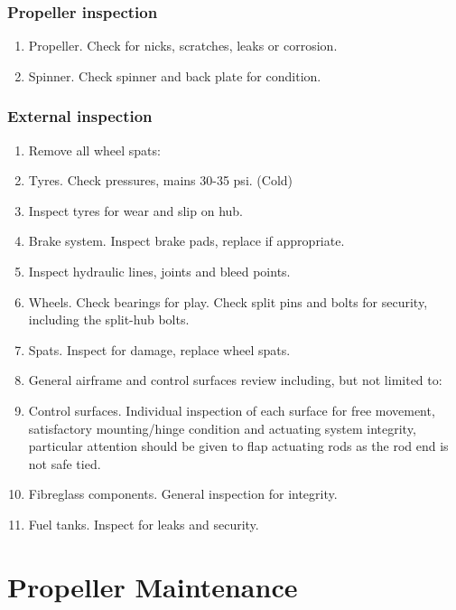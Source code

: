 \subsubsection{Propeller inspection}
\begin{enumerate}
\item Propeller. Check for nicks, scratches, leaks or corrosion.
\item Spinner. Check spinner and back plate for condition.
\end{enumerate}
\subsubsection{External inspection}
\begin{enumerate}
\item Remove all wheel spats:
\item Tyres. Check pressures, mains  30-35 psi. (Cold) %
\item Inspect tyres for wear and slip on hub.
\item Brake system. Inspect brake pads, replace if appropriate.
\item Inspect hydraulic lines, joints and bleed points.
\item Wheels. Check bearings for play. Check split pins and bolts for security, including the split-hub bolts.
\item Spats. Inspect for damage, replace wheel spats.
\item General airframe and control surfaces review including, but not limited to:
\item Control surfaces. Individual inspection of each surface for free movement, satisfactory mounting/hinge condition
and actuating system integrity, particular attention should be given to flap actuating rods as the rod end is not
safe tied.
\item Fibreglass components. General inspection for integrity.
\item Fuel tanks. Inspect for leaks and security.
\end{enumerate}


\section{Propeller Maintenance}
